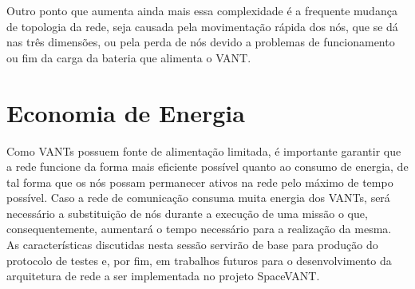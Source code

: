 Outro ponto que aumenta ainda mais essa complexidade é a frequente mudança de topologia da rede, seja causada pela movimentação rápida dos nós, que se dá nas três dimensões, ou pela perda de nós devido a problemas de funcionamento ou fim da carga da bateria que alimenta o VANT.

\section{Economia de Energia}

Como VANTs possuem fonte de alimentação limitada, é importante garantir que a rede funcione da forma mais eficiente possível quanto ao consumo de energia, de tal forma que os nós possam permanecer ativos na rede pelo máximo de tempo possível. Caso a rede de comunicação consuma muita energia dos VANTs, será necessário a substituição de nós durante a execução de uma missão o que, consequentemente, aumentará o tempo necessário para a realização da mesma.\\

As características discutidas nesta sessão servirão de base para produção do protocolo de testes e, por fim, em trabalhos futuros para o desenvolvimento da arquitetura de rede a ser implementada no projeto SpaceVANT. 